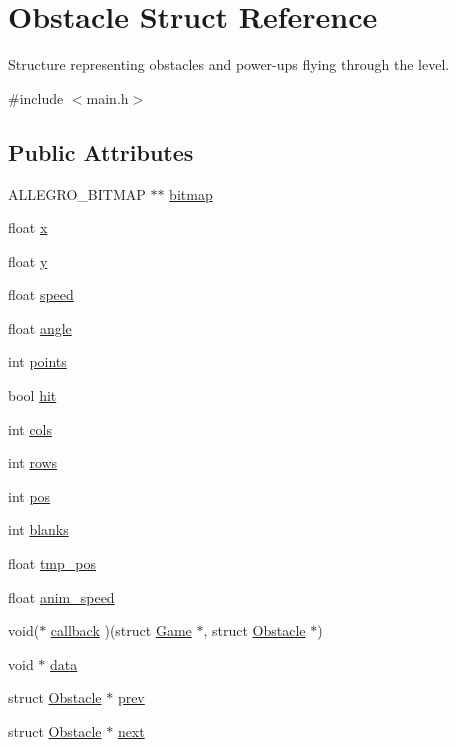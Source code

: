 \hypertarget{structObstacle}{\section{Obstacle Struct Reference}
\label{structObstacle}
}


Structure representing obstacles and power-\/ups flying through the level.  




{\ttfamily \#include $<$main.\-h$>$}

\subsection*{Public Attributes}
\begin{DoxyCompactItemize}
\item 
A\-L\-L\-E\-G\-R\-O\-\_\-\-B\-I\-T\-M\-A\-P $\ast$$\ast$ \hyperlink{structObstacle_a1f35f88fe8f6d0664da082f82ae4b774}{bitmap}
\item 
float \hyperlink{structObstacle_ad9cd25e0032f6692a4f93a057ccdfd85}{x}
\item 
float \hyperlink{structObstacle_af4b6f012014e2fa5aef193330f70fdef}{y}
\item 
float \hyperlink{structObstacle_a1e2b46db05325273ce0fcba3550b5b2a}{speed}
\item 
float \hyperlink{structObstacle_a99d85ef4e92f7e899b49ac85b2e1dbdc}{angle}
\item 
int \hyperlink{structObstacle_a38a164a0e4d6f6508fb65c6eff39147f}{points}
\item 
bool \hyperlink{structObstacle_ac89d025f4ad7c2f083d262c1bee4e851}{hit}
\item 
int \hyperlink{structObstacle_ad51aa07361c732a47e78c80fae2fab7c}{cols}
\item 
int \hyperlink{structObstacle_aab33c9d4c0f05d02fda4e77cff7d7e72}{rows}
\item 
int \hyperlink{structObstacle_a5228dff4dc773a66043e822fb4d6d00c}{pos}
\item 
int \hyperlink{structObstacle_a862f4038bd63057d91406720bb586a9c}{blanks}
\item 
float \hyperlink{structObstacle_afd620c4c3496cd6f84184dcda4ca7611}{tmp\-\_\-pos}
\item 
float \hyperlink{structObstacle_a96a13e4704e4643291989193a112366a}{anim\-\_\-speed}
\item 
void($\ast$ \hyperlink{structObstacle_a21b4ff0edaa2dc5394ff7a6328e48358}{callback} )(struct \hyperlink{structGame}{Game} $\ast$, struct \hyperlink{structObstacle}{Obstacle} $\ast$)
\item 
void $\ast$ \hyperlink{structObstacle_a88728e624cc62993e2bf52aff816cdff}{data}
\item 
struct \hyperlink{structObstacle}{Obstacle} $\ast$ \hyperlink{structObstacle_a13bc07b730f58d5b1c3db68e8e4aca27}{prev}
\item 
struct \hyperlink{structObstacle}{Obstacle} $\ast$ \hyperlink{structObstacle_aedbcf65351fa59ca9f18f6fba0287dc1}{next}
\end{DoxyCompactItemize}


